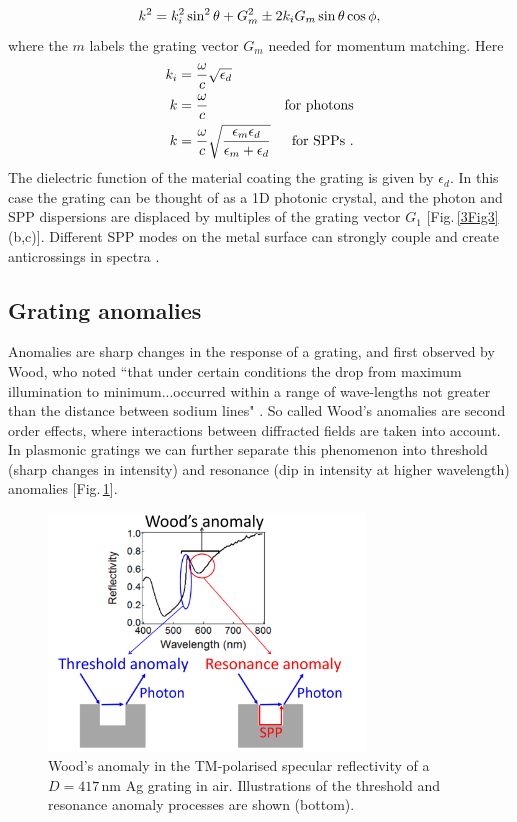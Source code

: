 \begin{equation}
\centering
k^2 = k_i^2\sin^2\theta+G_m^2\pm2k_iG_m\sin\theta\cos\phi ,
\label{GratingDisp}
\end{equation}
where the $m$ labels the grating vector $G_m$ needed for momentum matching. Here
\begin{subequations}
\label{kmodes}
\begin{align}
\centering
k_i &= \frac{\omega}{c}\sqrt{\epsilon_d}& \\
k&=\frac{\omega}{c}& \textnormal{for photons} \label{kphot} \\
k &= \frac{\omega}{c}\sqrt{\frac{\epsilon_m\epsilon_d}{\epsilon_m+\epsilon_d}}& \textnormal{for SPPs .} \label{kspp}
\end{align}
\end{subequations}
The dielectric function of the material coating the grating is given by $\epsilon_d$. In this case the grating can be thought of as a 1D photonic crystal, and the photon and SPP dispersions are displaced by multiples of the grating vector $G_1$ [Fig.\,\ref{3Fig3}(b,c)]. Different SPP modes on the metal surface can strongly couple and create anticrossings in spectra \cite{Chen1983}.



\subsection{Grating anomalies}

Anomalies are sharp changes in the response of a grating, and first observed by Wood, who noted ``that under certain conditions the drop from maximum illumination to minimum...occurred within a range of wave-lengths not greater than the distance between sodium lines" \cite{Wood1902}. So called Wood's anomalies are second order effects, where interactions between diffracted fields are taken into account. In plasmonic gratings we can further separate this phenomenon into threshold (sharp changes in intensity) and resonance (dip in intensity at higher wavelength) anomalies [Fig.\,\ref{3Fig4}].
\begin{figure}[h!] 
\centering    
\includegraphics[width=0.75\textwidth]{Fig4}
\caption{Wood's anomaly in the TM-polarised specular reflectivity of a $D=417$\,nm Ag grating in air. Illustrations of the threshold and resonance anomaly processes are shown (bottom).}
\label{3Fig4}
\end{figure}

